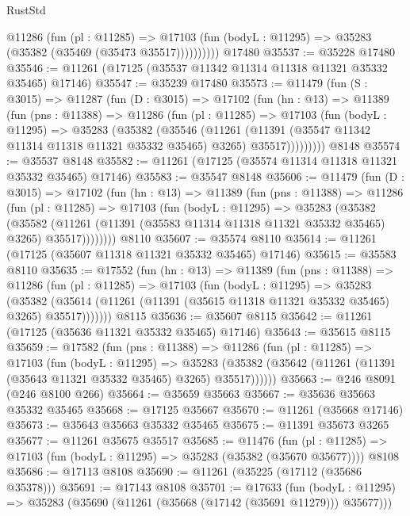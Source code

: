 \begin{lexlean}{RustStd}
\begin{coremodule}
            @11286
              (fun (pl : @11285) =>
              @17103 (fun (bodyL : @11295) => @35283 (@35382 (@35469 (@35473 @35517))))))))))
    @17480
@35537 := @35228 @17480
@35546 := @11261 (@17125 (@35537 @11342 @11314 @11318 @11321 @35332 @35465) @17146)
@35547 := @35239 @17480
@35573 := @11479
    (fun (S : @3015) =>
    @11287
      (fun (D : @3015) =>
      @17102
        (fun (hn : @13) =>
        @11389
          (fun (pns : @11388) =>
          @11286
            (fun (pl : @11285) =>
            @17103
              (fun (bodyL : @11295) =>
              @35283
                (@35382
                  (@35546
                    (@11261
                      (@11391 (@35547 @11342 @11314 @11318 @11321 @35332 @35465) @3265)
                      @35517)))))))))
    @8148
@35574 := @35537 @8148
@35582 := @11261 (@17125 (@35574 @11314 @11318 @11321 @35332 @35465) @17146)
@35583 := @35547 @8148
@35606 := @11479
    (fun (D : @3015) =>
    @17102
      (fun (hn : @13) =>
      @11389
        (fun (pns : @11388) =>
        @11286
          (fun (pl : @11285) =>
          @17103
            (fun (bodyL : @11295) =>
            @35283
              (@35382
                (@35582
                  (@11261 (@11391 (@35583 @11314 @11318 @11321 @35332 @35465) @3265) @35517))))))))
    @8110
@35607 := @35574 @8110
@35614 := @11261 (@17125 (@35607 @11318 @11321 @35332 @35465) @17146)
@35615 := @35583 @8110
@35635 := @17552
    (fun (hn : @13) =>
    @11389
      (fun (pns : @11388) =>
      @11286
        (fun (pl : @11285) =>
        @17103
          (fun (bodyL : @11295) =>
          @35283
            (@35382
              (@35614 (@11261 (@11391 (@35615 @11318 @11321 @35332 @35465) @3265) @35517)))))))
    @8115
@35636 := @35607 @8115
@35642 := @11261 (@17125 (@35636 @11321 @35332 @35465) @17146)
@35643 := @35615 @8115
@35659 := @17582
    (fun (pns : @11388) =>
    @11286
      (fun (pl : @11285) =>
      @17103
        (fun (bodyL : @11295) =>
        @35283 (@35382 (@35642 (@11261 (@11391 (@35643 @11321 @35332 @35465) @3265) @35517))))))
@35663 := @246 @8091 (@246 @8100 @266)
@35664 := @35659 @35663
@35667 := @35636 @35663 @35332 @35465
@35668 := @17125 @35667
@35670 := @11261 (@35668 @17146)
@35673 := @35643 @35663 @35332 @35465
@35675 := @11391 @35673 @3265
@35677 := @11261 @35675 @35517
@35685 := @11476
    (fun (pl : @11285) => @17103 (fun (bodyL : @11295) => @35283 (@35382 (@35670 @35677))))
    @8108
@35686 := @17113 @8108
@35690 := @11261 (@35225 (@17112 (@35686 @35378)))
@35691 := @17143 @8108
@35701 := @17633
    (fun (bodyL : @11295) => @35283 (@35690 (@11261 (@35668 (@17142 (@35691 @11279))) @35677)))

\end{coremodule}
\end{lexlean}
